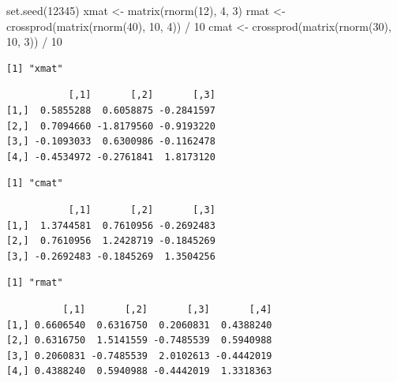 \documentclass[
  12pt,
  letterpaper,
  DIV=11,
  numbers=noendperiod]{scrartcl}
\newenvironment{Shaded}{\begin{snugshade}}{\end{snugshade}}
\newcommand{\DecValTok}[1]{\textcolor[rgb]{0.68,0.00,0.00}{#1}}
\newcommand{\FunctionTok}[1]{\textcolor[rgb]{0.28,0.35,0.67}{#1}}
\newcommand{\NormalTok}[1]{\textcolor[rgb]{0.00,0.23,0.31}{#1}}
\newcommand{\OtherTok}[1]{\textcolor[rgb]{0.00,0.23,0.31}{#1}}
\newcommand{\SpecialCharTok}[1]{\textcolor[rgb]{0.37,0.37,0.37}{#1}}
\newcommand{\sectionbreak}{\clearpage}
\begin{document}
\begin{Shaded}
\begin{Highlighting}[]
\FunctionTok{set.seed}\NormalTok{(}\DecValTok{12345}\NormalTok{)}
\NormalTok{xmat }\OtherTok{\textless{}{-}} \FunctionTok{matrix}\NormalTok{(}\FunctionTok{rnorm}\NormalTok{(}\DecValTok{12}\NormalTok{), }\DecValTok{4}\NormalTok{, }\DecValTok{3}\NormalTok{)}
\NormalTok{rmat }\OtherTok{\textless{}{-}} \FunctionTok{crossprod}\NormalTok{(}\FunctionTok{matrix}\NormalTok{(}\FunctionTok{rnorm}\NormalTok{(}\DecValTok{40}\NormalTok{), }\DecValTok{10}\NormalTok{, }\DecValTok{4}\NormalTok{)) }\SpecialCharTok{/} \DecValTok{10}
\NormalTok{cmat }\OtherTok{\textless{}{-}} \FunctionTok{crossprod}\NormalTok{(}\FunctionTok{matrix}\NormalTok{(}\FunctionTok{rnorm}\NormalTok{(}\DecValTok{30}\NormalTok{), }\DecValTok{10}\NormalTok{, }\DecValTok{3}\NormalTok{)) }\SpecialCharTok{/} \DecValTok{10}
\end{Highlighting}
\end{Shaded}

\begin{verbatim}
[1] "xmat"
\end{verbatim}

\begin{verbatim}
           [,1]       [,2]       [,3]
[1,]  0.5855288  0.6058875 -0.2841597
[2,]  0.7094660 -1.8179560 -0.9193220
[3,] -0.1093033  0.6300986 -0.1162478
[4,] -0.4534972 -0.2761841  1.8173120
\end{verbatim}

\begin{verbatim}
[1] "cmat"
\end{verbatim}

\begin{verbatim}
           [,1]       [,2]       [,3]
[1,]  1.3744581  0.7610956 -0.2692483
[2,]  0.7610956  1.2428719 -0.1845269
[3,] -0.2692483 -0.1845269  1.3504256
\end{verbatim}

\begin{verbatim}
[1] "rmat"
\end{verbatim}

\begin{verbatim}
          [,1]       [,2]       [,3]       [,4]
[1,] 0.6606540  0.6316750  0.2060831  0.4388240
[2,] 0.6316750  1.5141559 -0.7485539  0.5940988
[3,] 0.2060831 -0.7485539  2.0102613 -0.4442019
[4,] 0.4388240  0.5940988 -0.4442019  1.3318363
\end{verbatim}

\sectionbreak
\end{document}
